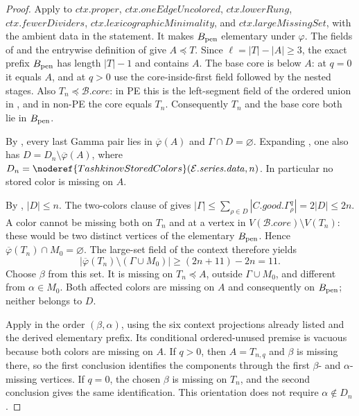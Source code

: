 \begin{proof}
Apply  to
$\mathit{ctx.proper}$, $\mathit{ctx.oneEdgeUncolored}$,
$\mathit{ctx.lowerRung}$, $\mathit{ctx.fewerDividers}$,
$\mathit{ctx.lexicographicMinimality}$, and
$\mathit{ctx.largeMissingSet}$, with the ambient data in the statement.
It makes $B_{\rm pen}$ elementary under $\varphi$.
The fields of  and the entrywise definition
of  give $A\preccurlyeq T$.
Since $\ell=|T|-|A|\ge3$, the exact prefix $B_{\rm pen}$ has length
$|T|-1$ and contains $A$. The base core is below $A$: at $q=0$
it equals $A$, and at $q>0$ use the core-inside-first field followed
by the nested stages. Also $T_n\preccurlyeq\mathcal B.\mathit{core}$:
in PE this is the left-segment field of the ordered union in
, and in non-PE the core equals $T_n$.
Consequently $T_n$ and the base core both lie in $B_{\rm pen}$.

By , every last Gamma pair lies
in $\overline\varphi(A)$ and $\Gamma\cap D=\varnothing$.
Expanding , one also has
$D=D_n\setminus\overline\varphi(A)$, where
$D_n=\noderef{TashkinovStoredColors}(\mathcal E.\mathit{series.data},n)$.
In particular no stored color is missing on $A$.

By , $|D|\le n$.
The two-colors clause of  gives
$|\Gamma|\le\sum_{\rho\in D}|C.\mathit{good}.\Gamma^q_\rho|
=2|D|\le2n$. A color cannot be missing both on $T_n$ and at a
vertex in $V(\mathcal B.\mathit{core})\setminus V(T_n)$:
these would be two distinct vertices of the elementary $B_{\rm pen}$.
Hence $\overline\varphi(T_n)\cap M_0=\varnothing$. The large-set
field of the context therefore yields
\[
 |\overline\varphi(T_n)\setminus(\Gamma\cup M_0)|
 \ge (2n+11)-2n=11.
\]
Choose $\beta$ from this set. It is missing on $T_n\preccurlyeq A$,
outside $\Gamma\cup M_0$, and different from $\alpha\in M_0$.
Both affected colors are missing on $A$ and consequently on
$B_{\rm pen}$; neither belongs to $D$.

Apply  in the order $(\beta,\alpha)$, using the
six context projections already listed and the derived elementary
prefix. Its conditional ordered-unused premise is vacuous because both
colors are missing on $A$. If $q>0$, then $A=T_{n,q}$ and $\beta$
is missing there, so the first conclusion identifies the components
through the first $\beta$- and $\alpha$-missing vertices. If $q=0$,
the chosen $\beta$ is missing on $T_n$, and the second conclusion
gives the same identification. This orientation does not require
$\alpha\notin D_n$.


\end{proof}
